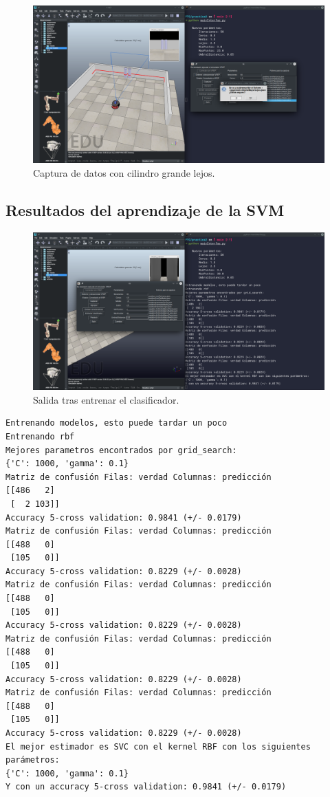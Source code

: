 \documentclass[12pt, spanish]{article}
\begin{document}
\begin{figure}[H]
    \centering
    \includegraphics[width=\textwidth]{cilindro_m_lejos.png}
    \caption{Captura de datos con cilindro grande lejos.}
\end{figure}

\subsection{Resultados del aprendizaje de la SVM}

\begin{figure}[H]
    \centering
    \includegraphics[width=\textwidth]{salida_entrenar.png}
    \caption{Salida tras entrenar el clasificador.}
\end{figure}



\begin{lstlisting}
Entrenando modelos, esto puede tardar un poco
Entrenando rbf
Mejores parametros encontrados por grid_search:
{'C': 1000, 'gamma': 0.1}
Matriz de confusión Filas: verdad Columnas: predicción
[[486   2]
 [  2 103]]
Accuracy 5-cross validation: 0.9841 (+/- 0.0179)
Matriz de confusión Filas: verdad Columnas: predicción
[[488   0]
 [105   0]]
Accuracy 5-cross validation: 0.8229 (+/- 0.0028)
Matriz de confusión Filas: verdad Columnas: predicción
[[488   0]
 [105   0]]
Accuracy 5-cross validation: 0.8229 (+/- 0.0028)
Matriz de confusión Filas: verdad Columnas: predicción
[[488   0]
 [105   0]]
Accuracy 5-cross validation: 0.8229 (+/- 0.0028)
Matriz de confusión Filas: verdad Columnas: predicción
[[488   0]
 [105   0]]
Accuracy 5-cross validation: 0.8229 (+/- 0.0028)
El mejor estimador es SVC con el kernel RBF con los siguientes parámetros: 
{'C': 1000, 'gamma': 0.1}
Y con un accuracy 5-cross validation: 0.9841 (+/- 0.0179)
\end{lstlisting}
\end{document}
